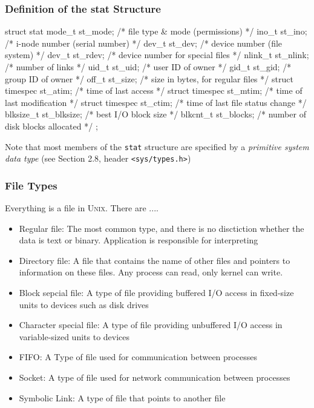 \documentclass[newPxFont,sthlmFooter,nooffset]{beamer}
\begin{document}
\begin{frame}[containsverbatim,t]
  \frametitle{Definition of the stat Structure}
\begin{codedef}
struct stat {
   mode_t	st_mode;	/* file type & mode (permissions) */
   ino_t	st_ino;	/* i-node number (serial number) */
   dev_t	st_dev;	/* device number (file system) */
   dev_t	st_rdev;	/* device number for special files */
   nlink_t	st_nlink;	/* number of links */
   uid_t	st_uid;	        /* user ID of owner */
   gid_t	st_gid;	        /* group ID of owner */
   off_t	st_size;	/* size in bytes, for regular files */
   struct timespec st_atim;	/* time of last access */
   struct timespec st_mtim;	/* time of last modification */
   struct timespec st_ctim;	/* time of last file status change */
   blksize_t       st_blksize; /* best I/O block size */
   blkcnt_t        st_blocks;  /* number of disk blocks allocated */
};
\end{codedef}

Note that most members of the \texttt{stat} structure are specified by a \textit{primitive system data type} (see Section 2.8, header \texttt{<sys/types.h>})
\end{frame}

\begin{frame}[t]
  \frametitle{File Types}
Everything is a file in \textsc{Unix}. There are ....
\begin{itemize}
\item Regular file: {\footnotesize The most common type, and there is
    no disctiction whether the data is text or binary. Application is
    responsible for interpreting}
\item Directory file: {\footnotesize A file that contains the name of
    other files and pointers to information on these files. Any
    process can read, only kernel can write.}
\item Block sepcial file: {\footnotesize A type of file providing
    buffered I/O access in fixed-size units to devices such as disk
    drives}
\item Character special file: {\footnotesize A type of file providing
    unbuffered I/O access in variable-sized units to devices}
\item FIFO: {\footnotesize A Type of file used for communication
    between processes}
\item Socket: {\footnotesize A type of file used for network
    communication between processes}
\item Symbolic Link: {\footnotesize A type of file that points to another file}
\end{itemize}
\end{frame}
\end{document}
